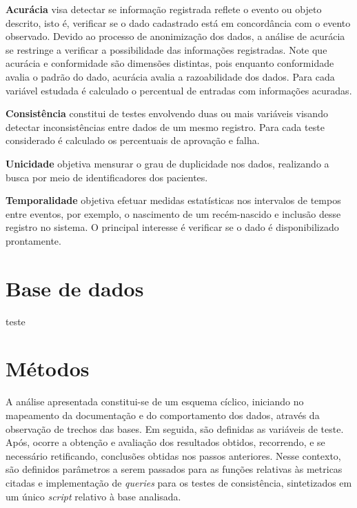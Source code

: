\documentclass[
  12,
  table]{proadi}
\begin{document}
\textbf{Acurácia} visa detectar se informação registrada reflete o
evento ou objeto descrito, isto é, verificar se o dado cadastrado está
em concordância com o evento observado. Devido ao processo de
anonimização dos dados, a análise de acurácia se restringe a verificar a
possibilidade das informações registradas. Note que acurácia e
conformidade são dimensões distintas, pois enquanto conformidade avalia
o padrão do dado, acurácia avalia a razoabilidade dos dados. Para cada
variável estudada é calculado o percentual de entradas com informações
acuradas.

\textbf{Consistência} constitui de testes envolvendo duas ou mais
variáveis visando detectar inconsistências entre dados de um mesmo
registro. Para cada teste considerado é calculado os percentuais de
aprovação e falha.

\textbf{Unicidade} objetiva mensurar o grau de duplicidade nos dados,
realizando a busca por meio de identificadores dos pacientes.

\textbf{Temporalidade} objetiva efetuar medidas estatísticas nos
intervalos de tempos entre eventos, por exemplo, o nascimento de um
recém-nascido e inclusão desse registro no sistema. O principal
interesse é verificar se o dado é disponibilizado prontamente.

\hypertarget{base-de-dados}{%
\section{Base de dados}\label{base-de-dados}}

teste

\renewcommand{\arraystretch}{1.25}

\renewcommand{\arraystretch}{1}

\hypertarget{muxe9todos}{%
\section{Métodos}\label{muxe9todos}}

A análise apresentada constitui-se de um esquema cíclico, iniciando no
mapeamento da documentação e do comportamento dos dados, através da
observação de trechos das bases. Em seguida, são definidas as variáveis
de teste. Após, ocorre a obtenção e avaliação dos resultados obtidos,
recorrendo, e se necessário retificando, conclusões obtidas nos passos
anteriores. Nesse contexto, são definidos parâmetros a serem passados
para as funções relativas às metricas citadas e implementação de
\emph{queries} para os testes de consistência, sintetizados em um único
\emph{script} relativo à base analisada.
\end{document}

